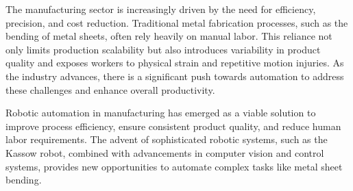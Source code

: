 The manufacturing sector is increasingly driven by the need for efficiency, precision, and cost reduction. Traditional metal fabrication processes, such as the bending of metal sheets, often rely heavily on manual labor. This reliance not only limits production scalability but also introduces variability in product quality and exposes workers to physical strain and repetitive motion injuries. As the industry advances, there is a significant push towards automation to address these challenges and enhance overall productivity.

Robotic automation in manufacturing has emerged as a viable solution to improve process efficiency, ensure consistent product quality, and reduce human labor requirements. The advent of sophisticated robotic systems, such as the Kassow robot, combined with advancements in computer vision and control systems, provides new opportunities to automate complex tasks like metal sheet bending.
